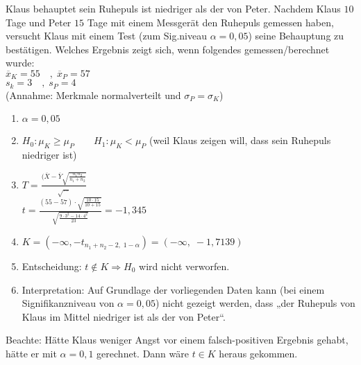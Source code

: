  Klaus behauptet sein Ruhepuls ist niedriger als der von Peter. Nachdem Klaus $10$ Tage und Peter $15$ Tage mit einem Messgerät den Ruhepuls gemessen haben, versucht Klaus mit einem Test (zum Sig.niveau $\alpha = 0,05$) seine Behauptung zu bestätigen. Welches Ergebnis zeigt sich, wenn folgendes gemessen/berechnet wurde:\\
$\overline{x}_K=55\quad, \; \overline{x}_P=57$\\
$s_k = 3 \quad, \; s_P = 4$\\
(Annahme: Merkmale normalverteilt und $\sigma_P=\sigma_K$)
\begin{enumerate}
\item $\alpha = 0,05$
\item $H_0:\mu_K \geq \mu_P \qquad H_1: \mu_K < \mu_P$ (weil Klaus zeigen will, dass sein Ruhepuls niedriger ist)
\item $T=\frac{(\overline{X}-\overline{Y}\sqrt{\frac{n_1 n_2}{n_1+n_2}}}{\sqrt{\dots}}$\\
$t=\frac{(55-57)\cdot \sqrt{\frac{10\cdot 15}{10 + 15}}}{\sqrt{\frac{9\cdot 3^2 - 14 \cdot 4^2}{23}}}=-1,345$
\item $K=(-\infty, -t_{n_1+n_2-2, \; 1-\alpha})=(-\infty, \; - 1,7139)$
\item Entscheidung: $t\not \in K \Rightarrow H_0$ wird nicht verworfen.
\item Interpretation: Auf Grundlage der vorliegenden Daten kann (bei einem Signifikanzniveau von $\alpha=0,05$) nicht gezeigt werden, dass „der Ruhepuls von Klaus im Mittel niedriger ist als der von Peter“.
\end{enumerate}
Beachte: Hätte Klaus weniger Angst vor einem falsch-positiven Ergebnis gehabt, hätte er mit $\alpha=0,1$ gerechnet. Dann wäre $t\in K$ heraus gekommen.

